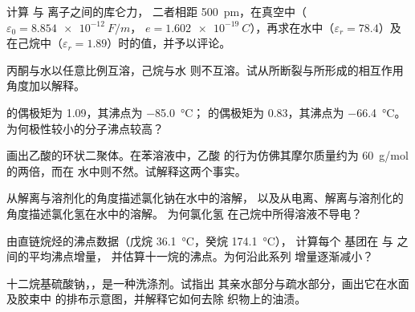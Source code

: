 \begin{exercise}[$\star\star$]\label{exo:b1:intermolecular-forces-solvents:6}
计算  与  离子之间的库仑力，
二者相距 \qty{500}{pm}，在真空中（$\varepsilon_0 = \qty{8.854e-12}{F/m}$，
$e = \qty{1.602e-19}{C}$），再求在水中（$\varepsilon_r = 78.4$）及
在己烷中（$\varepsilon_r = 1.89$）时的值，并予以评论。
\end{exercise}

\begin{exercise}[$\star\star$]\label{exo:b1:intermolecular-forces-solvents:7}
丙酮与水以任意比例互溶，己烷与水
则不互溶。试从所断裂与所形成的相互作用角度加以解释。
\end{exercise}

\begin{exercise}[$\star\star$]\label{exo:b1:intermolecular-forces-solvents:8}
 的偶极矩为 \qty{1.09}{\debye}，其沸点为
\qty{-85.0}{\celsius}； 的偶极矩为 \qty{0.83}{\debye}，其沸点为
\qty{-66.4}{\celsius}。为何极性较小的分子沸点较高？
\end{exercise}

\begin{exercise}[$\star\star$]\label{exo:b1:intermolecular-forces-solvents:9}
画出乙酸的环状二聚体。在苯溶液中，乙酸
的行为仿佛其摩尔质量约为 \qty{60}{g/mol} 的两倍，而在
水中则不然。试解释这两个事实。
\end{exercise}

\begin{exercise}[$\star\star\star$]\label{exo:b1:intermolecular-forces-solvents:10}
从解离与溶剂化的角度描述氯化钠在水中的溶解，
以及从电离、解离与溶剂化的角度描述氯化氢在水中的溶解。
为何氯化氢
在己烷中所得溶液不导电？
\end{exercise}

\begin{exercise}[$\star\star\star$]\label{exo:b1:intermolecular-forces-solvents:11}
由直链烷烃的沸点数据（戊烷
\qty{36.1}{\celsius}，癸烷 \qty{174.1}{\celsius}），
计算每个  基团在  与  之间的平均沸点增量，
并估算十一烷的沸点。为何沿此系列
增量逐渐减小？
\end{exercise}

\begin{exercise}[$\star\star\star$]\label{exo:b1:intermolecular-forces-solvents:12}
十二烷基硫酸钠，，是一种洗涤剂。试指出
其亲水部分与疏水部分，画出它在水面及胶束中
的排布示意图，并解释它如何去除
织物上的油渍。
\end{exercise}

